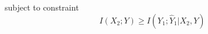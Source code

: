 \documentclass[preview]{standalone}
\begin{document}
\begin{center}
subject to constraint \[I(X_2;Y) \ge I(Y_1; \hat{Y}_1|X_2,Y)\]
\end{center}
\end{document}
